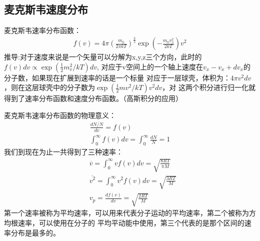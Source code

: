 \documentclass[UTF8]{article}
\numberwithin{equation}{section}
\begin{document}
\subsection{麦克斯韦速度分布}
麦克斯韦速率分布函数：
\begin{align*}
    f(v)=4\pi (\frac{m_0}{2\pi kT})^{\frac{3}{2}}\exp(-\frac{m_0 v_x^2}{2kT})v^2
\end{align*}
推导:对于速度来说是一个矢量可以分解为x,y,z三个方向，此时的$f(v)dv\propto \exp(\frac{1}{2}m_v^2/kT)dv$,
对应于v空间上的一个轴上速度在$v_x-v_x+dv_x$的分子数，如果现在扩展到速率的话是一个标量
对应于一层球壳，体积为：$4\pi v^2 dv$，则在这层球壳中的分子数为$\exp(\frac{1}{2}mv^2/kT)v^2dv$，对
这两个积分进行归一化就得到了速率分布函数和速度分布函数。（高斯积分的应用）
\begin{center}
\end{center}
麦克斯韦速率分布函数的物理意义：
\begin{align*}
    \frac{dN/N}{dv}=f(v)\\
    \int_{0}^{\infty}f(v)dv=\int_{0}^{\infty}\frac{dN}{N}=1
\end{align*}
我们到现在为止一共得到了三种速率：
\begin{align*}
    &\overline{v}=\int_{0}^{\infty} vf(v)dv=\sqrt{\frac{8RT}{\pi M}}\\
    &\overline{v^2}=\int_0^\infty v^2f(v)dv=\sqrt{\frac{3RT}{M}}\\
    &v_p=\frac{df(v)}{dv}=\sqrt{\frac{2RT}{M}}
\end{align*}
第一个速率被称为平均速率，可以用来代表分子运动的平均速率，第二个被称为方均根速率，可以使用在分子的
平均平动能中使用，第三个代表的是那个区间的速率分布是最多的。
\end{document}
